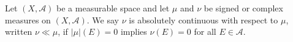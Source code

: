 Let $(X, \mathcal{A})$ be a measurable space and let $\mu$ and $\nu$ be signed or complex measures on $(X, \mathcal{A})$. We say $\nu$ is absolutely continuous with respect to $\mu$, written $\nu \ll \mu$, if $|\mu|(E) = 0$ implies $\nu(E) = 0$ for all $E \in \mathcal{A}$.
